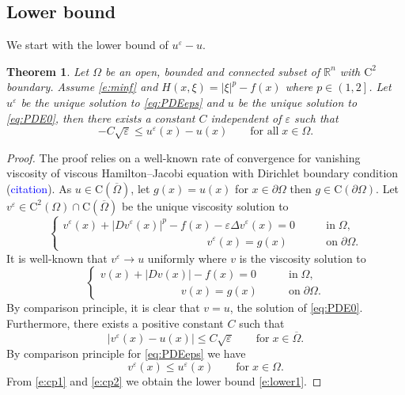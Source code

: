 \documentclass[11pt,reqno]{amsart}
\numberwithin{figure}{section}
\theoremstyle{plain}
\newtheorem{thm}{Theorem}[section]
\theoremstyle{remark}
\numberwithin{equation}{section}
\newcommand{\R}{\mathbb{R}}
\begin{document}
\subsection{Lower bound}
We start with the lower bound of $u^\varepsilon - u$.
\begin{thm} Let $\Omega$ be an open, bounded and connected subset of $\R^n$ with $\mathrm{C}^2$ boundary. Assume \eqref{e:minf} and $H(x,\xi) = |\xi|^p - f(x)$ where $p\in\left(1,2\right]$. Let $u^\varepsilon$ be the unique solution to \eqref{eq:PDEeps} and $u$ be the unique solution to \eqref{eq:PDE0}, then there exists a constant $C$ independent of $\varepsilon$ such that
\begin{equation}\label{e:lower1}
    -C\sqrt{\varepsilon} \leq u^\varepsilon(x) - u(x) \qquad\text{for all}\;x\in \Omega.
\end{equation} 
\end{thm}
\begin{proof} The proof relies on a well-known rate of convergence for vanishing viscosity of viscous Hamilton--Jacobi equation with Dirichlet boundary condition (\textcolor{blue}{citation}). As $u\in \mathrm{C}(\overline{\Omega})$, let $g(x) = u(x)$ for $x\in \partial\Omega$ then $g\in \mathrm{C}(\partial\Omega)$. Let $v^\varepsilon\in \mathrm{C}^2(\Omega)\cap \mathrm{C}(\overline{\Omega})$ be the unique viscosity solution to
\begin{equation*}
    \begin{cases}
          v^\varepsilon(x) + |Dv^\varepsilon(x)|^p - f(x) - \varepsilon \Delta v^\varepsilon(x) = 0 &\qquad\text{in}\;\Omega,\\
        \qquad\qquad\qquad\qquad\qquad \qquad\quad v^\varepsilon(x) = g(x) &\qquad\text{on}\;\partial\Omega.
    \end{cases}
\end{equation*}
It is well-known that $v^\varepsilon \to u$ uniformly where $v$ is the viscosity solution to
\begin{equation*}
\begin{cases}
       v(x) + |Dv(x)| - f(x) = 0 &\qquad\text{in}\;\Omega,\\
     \qquad\qquad\qquad\quad\; v(x) = g(x)&\qquad\text{on}\;\partial\Omega. 
\end{cases}
\end{equation*}
By comparison principle, it is clear that $v = u$, the solution of \eqref{eq:PDE0}. Furthermore, there exists a positive constant $C$ such that 
\begin{equation}\label{e:cp1}
     |v^\varepsilon(x)  - u(x)| \leq C\sqrt{\varepsilon} \qquad\text{for}\;x\in \overline{\Omega}.
\end{equation}
By comparison principle for \eqref{eq:PDEeps} we have
\begin{equation}\label{e:cp2}
    v^\varepsilon(x)\leq u^\varepsilon(x) \qquad\text{for}\;x\in \Omega.
\end{equation}
From \eqref{e:cp1} and \eqref{e:cp2} we obtain the lower bound \eqref{e:lower1}.
\end{proof}
\end{document}
